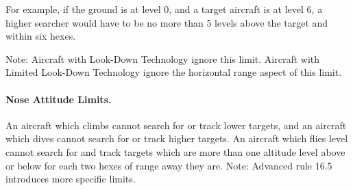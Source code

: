 For example, if the ground is at level 0, and a target aircraft is at level 6, a higher searcher would have to be no more than 5 levels above the target and within six hexes.

Note: Aircraft with Look-Down Technology ignore this limit. Aircraft with Limited Look-Down Technology ignore the horizontal range aspect of this limit.

\paragraph{Nose Attitude Limits.} An aircraft which climbs cannot search for or track lower targets, and an aircraft which dives cannot search for or track higher targets. An aircraft which flies level cannot search for and track targets which are more than one altitude level above or below for each two hexes of range away they are. Note: Advanced rule 16.5 introduces more specific limits.

